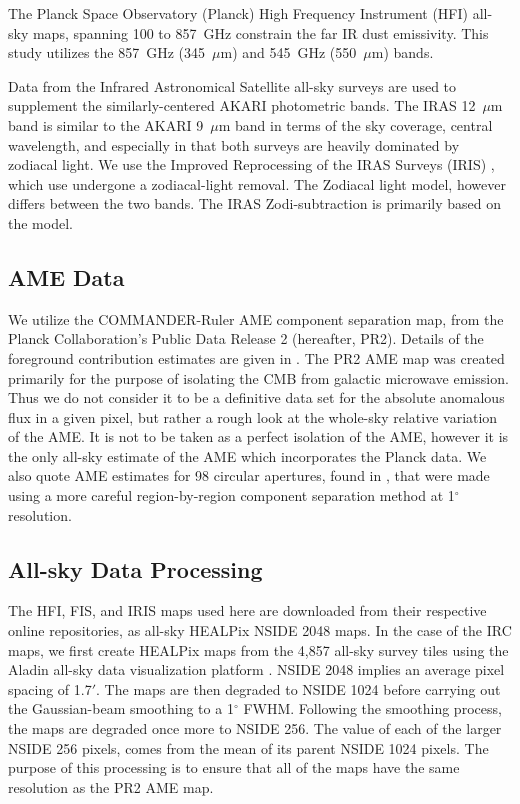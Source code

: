 \documentclass[preprint2,longabstract]{aastex}
\begin{document}
     The Planck Space Observatory (Planck) High Frequency Instrument (HFI) all-sky maps, spanning 100 to 857~GHz \citep{hfi14viii} constrain the far IR dust emissivity. This study utilizes the 857~GHz (345~$\mu$m) and 545~GHz (550~$\mu$m) bands.

     Data from the Infrared Astronomical Satellite \citep{iras84} all-sky surveys are used to supplement the similarly-centered AKARI photometric bands. The IRAS 12~$\mu$m band is similar to the AKARI 9~$\mu$m band in terms of the sky coverage, central wavelength, and especially in that both surveys are heavily dominated by zodiacal light. We use the Improved Reprocessing of the IRAS Surveys (IRIS) \citep{iris05}, which use undergone a zodiacal-light removal. The Zodiacal light model, however differs between the two bands. The IRAS Zodi-subtraction is primarily based on the \cite{kelsall98} model.

\subsection{AME Data}

     We utilize the COMMANDER-Ruler AME component separation map, from the Planck Collaboration's Public Data Release 2 (hereafter, PR2). Details of the foreground contribution estimates are given in \cite{planckXII}. The PR2 AME map was created primarily for the purpose of isolating the CMB from galactic microwave emission. Thus we do not consider it to be a definitive data set for the absolute anomalous flux in a given pixel, but rather a rough look at the whole-sky relative variation of the AME. It is not to be taken as a perfect isolation of the AME, however it is the only all-sky estimate of the AME which incorporates the Planck data. We also quote AME estimates for 98 circular apertures, found in \cite{planckXV}, that were made using a more careful region-by-region component separation method at 1$^{\circ}$ resolution.

\subsection{All-sky Data Processing}

      The HFI, FIS, and IRIS maps used here are downloaded from their respective online repositories, as all-sky HEALPix \citep{gorski15} NSIDE 2048 maps. In the case of the IRC maps, we first create HEALPix maps from the 4,857 all-sky survey tiles using the Aladin all-sky data visualization platform \citep{bonnarel00}. NSIDE 2048 implies an average pixel spacing of 1.7$'$. The maps are then degraded to NSIDE 1024 before carrying out the Gaussian-beam smoothing to a 1$^{\circ}$ FWHM. Following the smoothing process, the maps are degraded once more to NSIDE 256. The value of each of the larger NSIDE 256 pixels, comes from the mean of its parent NSIDE 1024 pixels. The purpose of this processing is to ensure that all of the maps have the same resolution as the PR2 AME map.
\end{document}
